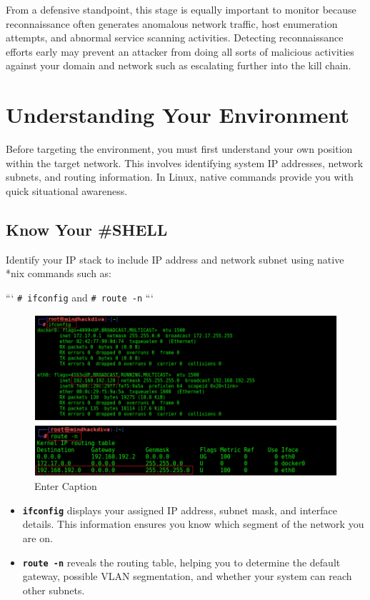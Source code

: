 From a defensive standpoint, this stage is equally important to monitor because reconnaissance often generates anomalous network traffic, host enumeration attempts, and abnormal service scanning activities. Detecting reconnaissance efforts early may prevent an attacker from doing all sorts of malicious activities against your domain and network such as escalating further into the kill chain.

\section{Understanding Your Environment}
Before targeting the environment, you must first understand your own position within the target network. This involves identifying system IP addresses, network subnets, and routing information. In Linux, native commands provide you with quick situational awareness.

\subsection{Know Your \#SHELL}
Identify your IP stack to include IP address and network subnet using native *nix commands such as:

```
\texttt{\# ifconfig}
and
\texttt{\# route -n}
```
\begin{figure}
    \centering
    \includegraphics[width=0.75\linewidth]{nixcommands.png}
    \caption{Enter Caption}
\end{figure}
\begin{itemize}
    \item \textbf \texttt{ifconfig} displays your assigned IP address, subnet mask, and interface details. This information ensures you know which segment of the network you are on.
    \item \textbf \texttt{route -n} reveals the routing table, helping you to determine the default gateway, possible VLAN segmentation, and whether your system can reach other subnets.
\end{itemize}

